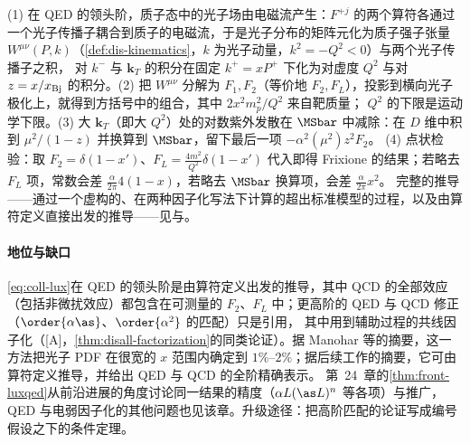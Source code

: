 \begin{proofsketch}
(1) 在 QED 的领头阶，质子态中的光子场由电磁流产生：$F^{+j}$ 的两个算符各通过一个光子传播子耦合到质子的电磁流，于是光子分布的矩阵元化为质子强子张量 $W^{\mu\nu}(P,k)$（\cref{def:dis-kinematics}，$k$ 为光子动量，$k^2=-Q^2<0$）与两个光子传播子之积，
对 $k^-$ 与 $\mathbf k_T$ 的积分在固定 $k^+=xP^+$ 下化为对虚度 $Q^2$ 与对 $z=x/x_{\rm Bj}$ 的积分。(2) 把 $W^{\mu\nu}$ 分解为 $F_1,F_2$（等价地 $F_2,F_L$），投影到横向光子极化上，就得到方括号中的组合，其中 $2x^2m_p^2/Q^2$ 来自靶质量；
$Q^2$ 的下限是运动学下限。(3) 大 $\mathbf k_T$（即大 $Q^2$）处的对数紫外发散在 $\MSbar$ 中减除：在 $D$ 维中积到 $\mu^2/(1-z)$ 并换算到 $\MSbar$，留下最后一项 $-\alpha^2(\mu^2)z^2F_2$。
(4) 点状检验：取 $F_2=\delta(1-x')$、$F_L=\frac{4m^2}{Q^2}\delta(1-x')$ 代入即得 Frixione 的结果；若略去 $F_L$ 项，常数会差 $\frac\alpha{2\pi}4(1-x)$，若略去 $\MSbar$ 换算项，会差 $\frac\alpha{2\pi}x^2$。
完整的推导——通过一个虚构的、在两种因子化写法下计算的超出标准模型的过程，以及由算符定义直接出发的推导——见\cite[式~(6)]{Manohar:2016nzj}与\cite{Manohar:2017eqh}。
\end{proofsketch}

\paragraph{地位与缺口}
\cref{eq:coll-lux}在 QED 的领头阶是由算符定义出发的推导，其中 QCD 的全部效应（包括非微扰效应）都包含在可测量的 $F_2$、$F_L$ 中；更高阶的 QED 与 QCD 修正（$\order{\alpha\as}$、$\order{\alpha^2}$ 的匹配）只是引用，
其中用到辅助过程的共线因子化（[A]，\cref{thm:disall-factorization}的同类论证）。据 Manohar 等的摘要，这一方法把光子 PDF 在很宽的 $x$ 范围内确定到 $1\%$--$2\%$\cite{Manohar:2016nzj}；据后续工作的摘要，它可由算符定义推导，并给出 QED 与 QCD 的全阶精确表示\cite{Manohar:2017eqh}。
第~24~章的\cref{thm:front-luxqed}从前沿进展的角度讨论同一结果的精度（$\alpha L(\as L)^n$ 等各项）与推广，QED 与电弱因子化的其他问题也见该章。升级途径：把高阶匹配的论证写成编号假设之下的条件定理。
